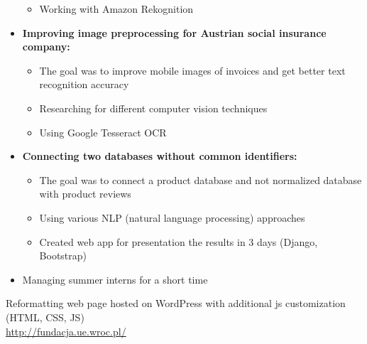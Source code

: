 \documentclass[10pt,a4paper,ragged2e,withhyper, normalphoto]{altacv}
\begin{document}
\begin{paracol}{2}
\begin{itemize}
\begin{itemize}
            \item Working with Amazon Rekognition
        \end{itemize}
        \item \textbf{\textcolor{DarkPastelRed}{Improving image preprocessing for Austrian social insurance company:}}
        \begin{itemize}
            \item The goal was to improve mobile images of invoices and get better text recognition accuracy 
            \item Researching for different computer vision techniques
            \item Using Google Tesseract OCR
        \end{itemize}
        \item \textcolor{DarkPastelRed}{\textbf{Connecting two databases without common identifiers:}}
        \begin{itemize}
            \item The goal was to connect a product database and not normalized database with product reviews 
            \item Using various NLP (natural language processing) approaches
            \item Created web app for presentation the results in 3 days (Django, Bootstrap)
        \end{itemize}
        \item Managing summer interns for a short time
    \end{itemize}
    
    \divider
\newpage
    
    Reformatting web page hosted on WordPress with additional js customization (HTML, CSS, JS) \\ \url{http://fundacja.ue.wroc.pl/}
    

\end{paracol}
\end{document}
